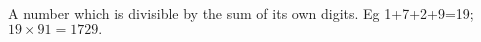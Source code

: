  A number which is divisible by the sum of its own digits.
Eg 1+7+2+9=19; \ensuremath{19 \times 91=1729.}
